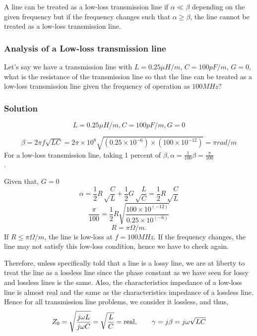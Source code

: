 A line can be treated as a low-loss transmission line if $\alpha \ll \beta$ depending on the given frequency but if the frequency changes such that $\alpha \geq \beta$, the line cannot be treated as a low-loss transmission line.

\begin{exmp}
\subsubsection*{Analysis of a Low-loss transmission line}\label{lec:lec5}
Let's say we have a transmission line with $L = 0.25\mu H/m$, ${C= 100pF/m}$, $G = 0$, what is the resistance of the transmission line so that the line can be treated as a low-loss transmission line given the frequency of operation as $100MHz$?

\subsubsection*{Solution}
\[L= 0.25\mu H/m, C= 100pF/m, G = 0\]

\begin{dmath*}
\beta = 2\pi f\sqrt{LC}
=2 \pi \times 10^8 \sqrt{(0.25 \times 10^{-6}) \times (100 \times 10^{-12})} = \pi rad/m
\end{dmath*}
For a low-loss transmission line, taking 1 percent of $\beta,
\alpha= \frac{1}{100}\beta = \frac{\pi}{100}$ \\.

 Given that, \(G=0\)
\begin{dmath*}
\alpha = \frac{1}{2} R \sqrt \frac{C}{L} + \frac{1}{2} G \sqrt \frac{L}{C} = \frac{1}{2} R \sqrt \frac{C}{L}
\end{dmath*}
\begin{equation*}
\frac{\pi}{100} = \frac{1}{2} R \sqrt{\frac{100 \times 10^{(-12)}}{0.25 \times 10^{(-6)}}}
\end{equation*}
\begin{equation*}
R=\pi\Omega/m.
\end{equation*}
If $R \leq \pi\Omega/m$, the line is low-loss at $ f= 100MHz$. If the frequency changes, the line may not satisfy this low-loss condition, hence we have to check again.
\end{exmp}

Therefore, unless specifically told that a line is a lossy line, we are at liberty to treat the line as a lossless line since the phase constant as we have seen for lossy and lossless lines is the same. Also, the characteristics impedance of a low-loss line is almost real and the same as the characteristics impedance of a lossless line. Hence for all transmission line problems, we consider it lossless, and thus,
\begin{align*}
Z_0 = \sqrt{{\frac{j\omega L}{j\omega C}}} = \sqrt{\frac{L}{C}} = \textnormal{real}, \quad \quad \gamma= j\beta = j\omega\sqrt{LC}
\end{align*}

